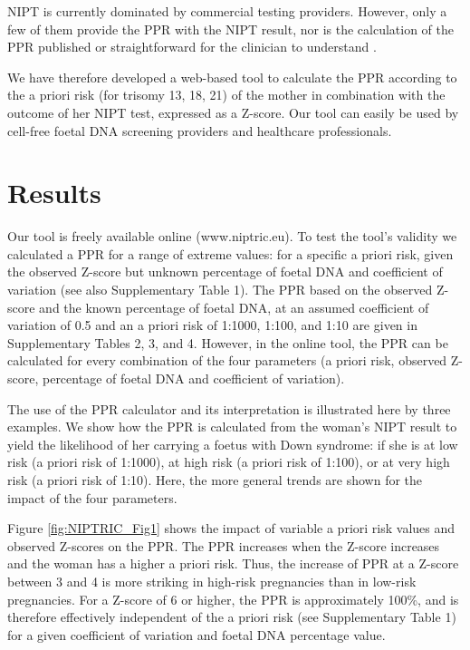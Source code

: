 NIPT is currently dominated by commercial testing providers. 
However, only a few of them provide the PPR with the NIPT result, nor is the calculation of the PPR published or straightforward for the clinician to understand \cite{Benn_2016}.

We have therefore developed a web-based tool to calculate the PPR according to the a priori risk (for trisomy 13, 18, 21) of the mother in combination with the outcome of her NIPT test, expressed as a Z-score. 
Our tool can easily be used by cell-free foetal DNA screening providers and healthcare professionals.

\section{Results}\label{results}
Our tool is freely available online (www.niptric.eu). 
To test the tool’s validity we calculated a PPR for a range of extreme values: for a specific a priori risk, given the observed Z-score but unknown percentage of foetal DNA and coefficient of variation (see also Supplementary Table 1).
The PPR based on the observed Z-score and the known percentage of foetal DNA, at an assumed coefficient of variation of 0.5 and an a priori risk of 1:1000, 1:100, and 1:10 are given in Supplementary Tables 2, 3, and 4. 
However, in the online tool, the PPR can be calculated for every combination of the four parameters (a priori risk, observed Z-score, percentage of foetal DNA and coefficient of variation).

The use of the PPR calculator and its interpretation is illustrated here by three examples. 
We show how the PPR is calculated from the woman’s NIPT result to yield the likelihood of her carrying a foetus with Down syndrome: if she is at low risk (a priori risk of 1:1000), at high risk (a priori risk of 1:100), or at very high risk (a priori risk of 1:10). 
Here, the more general trends are shown for the impact of the four parameters.

Figure \ref{fig:NIPTRIC_Fig1} shows the impact of variable a priori risk values and observed Z-scores on the PPR. 
The PPR increases when the Z-score increases and the woman has a higher a priori risk. Thus, the increase of PPR at a Z-score between 3 and 4 is more striking in high-risk pregnancies than in low-risk pregnancies. 
For a Z-score of 6 or higher, the PPR is approximately 100\%, and is therefore effectively independent of the a priori risk (see Supplementary Table 1) for a given coefficient of variation and foetal DNA percentage value.

